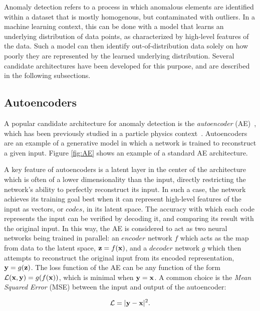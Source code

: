\documentclass[12pt, a4paper]{article}
\begin{document}
Anomaly detection refers to a process in which anomalous elements are identified within a dataset that is mostly homogenous, but contaminated with outliers. 
In a machine learning context, this can be done with a model that learns an underlying distribution of data points, as characterized by high-level features of the data. 
Such a model can then identify out-of-distribution data solely on how poorly they are represented by the learned underlying distribution. 
Several candidate architectures have been developed for this purpose, and are described in the following subsections.


\subsection{Autoencoders}

A popular candidate architecture for anomaly detection is the \textit{autoencoder} 
(AE)~\cite{bank2020autoencoders}, which has been previously studied in a particle physics context~\cite{Farina_2020, Heimel_2019}.
Autoencoders are an example of a generative model in which a network is trained to reconstruct a given input. 
Figure \ref{fig:AE} shows an example of a standard AE architecture.

A key feature of autoencoders is a latent layer in the center of the architecture which is often of a lower dimensionality than the input, directly restricting the network's ability to perfectly reconstruct its input. 
In such a case, the network achieves its training goal best when it can represent high-level features of the input as vectors, or $codes$, in its latent space. 
The accuracy with which each code represents the input can be verified by decoding it, and comparing its result with the original input. 
In this way, the AE is considered to act as two neural networks being trained in parallel: an $encoder$ network $f$
which acts as the map from data to the latent space, ${\textbf z}=f({\textbf x})$, and
a $decoder$ network $g$ which then attempts to reconstruct the original input from 
its encoded representation, ${\textbf y}=g({\textbf z})$. 
The loss function of the AE can be any function of the form $\mathcal{L}({\textbf x}, {\textbf y})=g(f({\textbf x}))$, which 
is minimal when ${\textbf y}={\textbf x}$. 
A common choice is the {\it Mean Squared Error} (MSE)
between the input and output of the autoencoder:

\begin{equation}
\mathcal{L}=|{\textbf y} - {\textbf x}|^2.
\end{equation}
\end{document}
